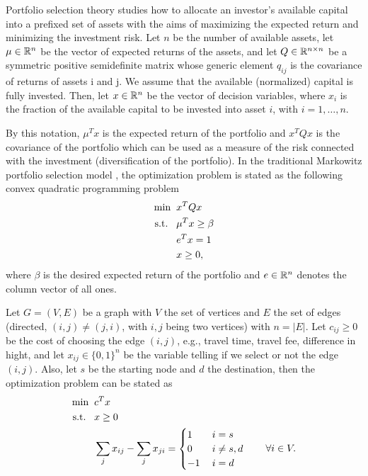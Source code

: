 \documentclass[10pt,a4paper]{article}
\begin{document}
\begin{example} Portfolio selection theory studies how to allocate an investor’s available capital into a prefixed set of assets with the aims of maximizing the expected return and minimizing the investment risk. Let $n$ be the number of available assets, let $\mu\in \mathbb{R}^n$ be the vector of expected returns of the assets, and let $Q \in \mathbb{R}^{n\times n}$ be a symmetric positive semidefinite matrix whose generic element $q_{ij}$ is the covariance of returns of assets i and j. We assume that the available (normalized) capital is fully invested. Then, let $x \in \mathbb{R}^n$ be the vector of decision variables, where $x_i$ is the fraction of the available capital to be invested into asset $i$, with $i = 1, \dots, n$. 
\par By this notation, $\mu^T x$ is the expected return of the portfolio and $x^TQx$ is the covariance of the portfolio which
can be used as a measure of the risk connected with the investment (diversification of the portfolio). 
In the traditional Markowitz portfolio selection model \cite{markowits52a}, the optimization problem is stated as the following convex quadratic programming problem
\begin{equation*}
	\begin{split}
		\min \;\; &x^TQx\\
		\text{s.t.} \;\;\;& \mu^Tx\geq \beta \\
		& e^Tx =1\\
		& x\geq 0,
	\end{split}
\end{equation*}
where $\beta$ is the desired expected return of the portfolio and $e\in \mathbb{R}^n$ denotes the column vector of all ones.
\end{example}
\begin{example} Let $G=(V,E)$ be a graph with $V$ the set of vertices and $E$ the set of edges (directed, $(i,j)\neq(j,i)$, with $i,j$ being two vertices) with $n=|E|$. Let $c_{ij}\geq0$ be the cost of choosing the edge $(i,j)$, e.g., travel time, travel fee, difference in hight, and let $x_{ij}\in \{0,1\}^{n}$ be the variable telling if we select or not the edge $(i,j)$. Also, let $s$ be the starting node and $d$ the destination, then the optimization problem can be stated as
\begin{equation*}
	\begin{split}
		\min \;\; &c^Tx\\
		\text{s.t.} \;\;\;& x\geq 0\\
		& \sum_{j} x_{ij} - \sum_{j} x_{ji} = \begin{cases}1 \quad & i=s\\
			0 & i\neq s,d\\
			-1 & i=d
		\end{cases} \qquad \forall i \in V.
	\end{split}
\end{equation*}
\end{example}
\end{document}
